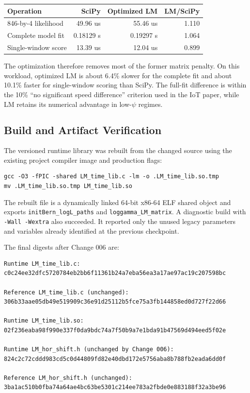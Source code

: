 \documentclass[11pt,a4paper]{article}
\begin{document}
\begin{center}
\begin{tabular}{l r r r}
\textbf{Operation} & \textbf{SciPy} & \textbf{Optimized LM} &
\textbf{LM/SciPy} \\
\hline
846-by-4 likelihood & 49.96 us & 55.46 us & 1.110 \\
Complete model fit & 0.18129 s & 0.19297 s & 1.064 \\
Single-window score & 13.39 us & 12.04 us & 0.899 \\
\end{tabular}
\end{center}

The optimization therefore removes most of the former matrix penalty. On this
workload, optimized LM is about 6.4\% slower for the complete fit and about
10.1\% faster for single-window scoring than SciPy. The full-fit difference is
within the 10\% ``no significant speed difference'' criterion used in the IoT
paper, while LM retains its numerical advantage in low-\(\psi\) regimes.

\subsection{Build and Artifact Verification}

The versioned runtime library was rebuilt from the changed source using the
existing project compiler image and production flags:

\begin{verbatim}
gcc -O3 -fPIC -shared LM_time_lib.c -lm -o .LM_time_lib.so.tmp
mv .LM_time_lib.so.tmp LM_time_lib.so
\end{verbatim}

The rebuilt file is a dynamically linked 64-bit x86-64 ELF shared object and
exports \texttt{initBern\_logL\_paths} and
\texttt{loggamma\_LM\_matrix}. A diagnostic build with
\texttt{-Wall -Wextra} also succeeded. It reported only the unused legacy
parameters and variables already identified at the previous checkpoint.

The final digests after Change 006 are:

\begin{verbatim}
Runtime LM_time_lib.c:
c0c24ee32dfc5720784eb2bb6f11361b24a7eba56ea3a17ae97ac19c207598bc

Reference LM_time_lib.c (unchanged):
306b33aae05db49e519909c36e91d25112b5fce75a3fb144858ed0d727f22d66

Runtime LM_time_lib.so:
02f236eaba98f990e337f0da9bdc74a7f50b9a7e1bda91b47569d494eed5f02e

Runtime LM_hor_shift.h (unchanged by Change 006):
824c2c72cddd983cd5c0d44809fd82e40dbd172e5756aba8b788fb2eada6dd0f

Reference LM_hor_shift.h (unchanged):
3ba1ac510b0fba74a64ae4bc63be5301c214ee783a2fbde0e883188f32a3be96
\end{verbatim}
\end{document}
